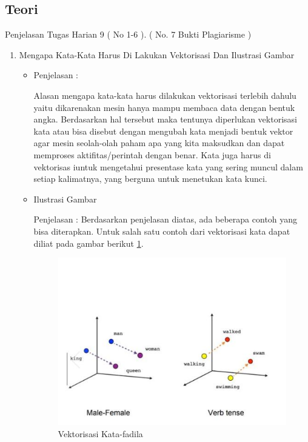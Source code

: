 \begin{enumerate}
\subsection{Teori}
Penjelasan Tugas Harian 9 ( No 1-6 ). ( No. 7 Bukti Plagiarisme )
\begin{enumerate}
\item Mengapa Kata-Kata Harus Di Lakukan Vektorisasi Dan Ilustrasi Gambar
\begin{itemize}
\item Penjelasan :
\par Alasan mengapa kata-kata harus dilakukan vektorisasi terlebih dahulu yaitu dikarenakan mesin hanya mampu membaca data dengan bentuk angka. Berdasarkan hal tersebut maka tentunya diperlukan vektorisasi kata atau bisa disebut dengan mengubah kata menjadi bentuk vektor agar mesin seolah-olah paham apa yang kita maksudkan dan dapat memproses aktifitas/perintah dengan benar. Kata juga harus di vektorisas iuntuk mengetahui presentase kata yang sering muncul dalam setiap kalimatnya, yang berguna untuk menetukan kata kunci.
\par
\item Ilustrasi Gambar
\par Penjelasan : Berdasarkan penjelasan diatas, ada beberapa contoh yang bisa diterapkan. Untuk salah satu contoh dari vektorisasi kata dapat diliat pada gambar berikut \ref{Vektorisasi Kata-fadila}.
\begin{figure}[!hbtp]
\centering
\includegraphics[scale=0.2]{figures/word-vec-fadila.jpg}
\caption{Vektorisasi Kata-fadila}
\label{Vektorisasi Kata-fadila}
\end{figure}
\par

\end{itemize}
\end{enumerate}
\end{enumerate}
